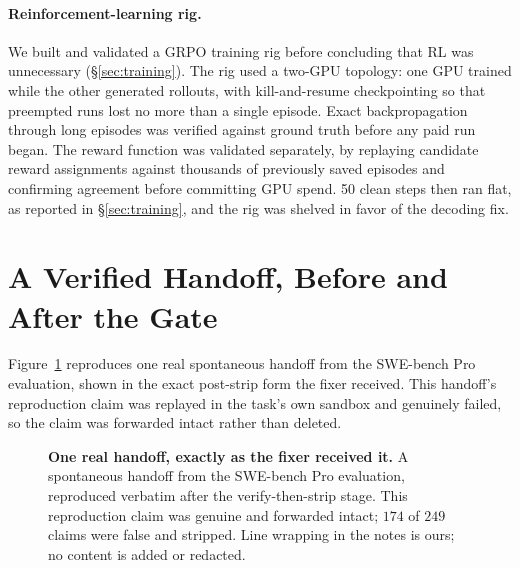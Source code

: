 \paragraph{Reinforcement-learning rig.}
We built and validated a GRPO training rig before concluding that RL was
unnecessary (\S\ref{sec:training}).  The rig used a two-GPU topology: one GPU
trained while the other generated rollouts, with kill-and-resume
checkpointing so that preempted runs lost no more than a single episode.
Exact backpropagation through long episodes was verified against ground truth
before any paid run began.  The reward function was validated separately, by
replaying candidate reward assignments against thousands of previously saved
episodes and confirming agreement before committing GPU spend.  50 clean
steps then ran flat, as reported in \S\ref{sec:training}, and the rig was
shelved in favor of the decoding fix.



\section{A Verified Handoff, Before and After the Gate}
\label{apx:handoff-example}

Figure~\ref{fig:apx-handoff-example} reproduces one real spontaneous handoff
from the SWE-bench Pro evaluation, shown in the exact post-strip form the
fixer received.  This handoff's reproduction claim was replayed in the task's
own sandbox and genuinely failed, so the claim was forwarded intact rather
than deleted.

\begin{figure}[H]
\centering
\footnotesize

\caption{\textbf{One real handoff, exactly as the fixer received it.}
A spontaneous handoff from the SWE-bench Pro evaluation, reproduced
verbatim after the verify-then-strip stage.  This reproduction claim was
genuine and forwarded intact; $174$ of $249$ claims were false and
stripped.  Line wrapping in the notes is ours; no content is added or
redacted.}
\label{fig:apx-handoff-example}
\end{figure}



\newpage
